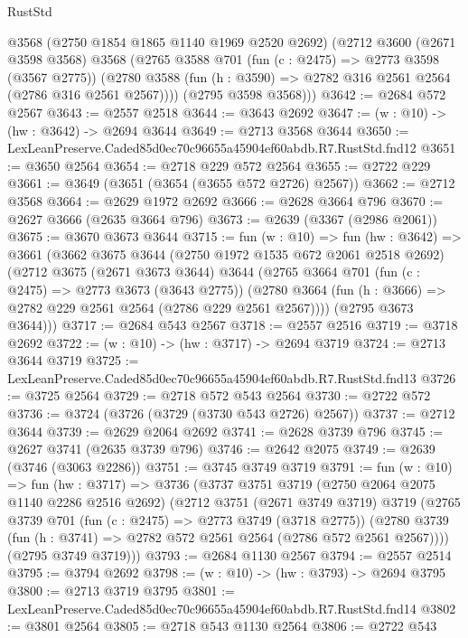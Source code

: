 \begin{lexlean}{RustStd}
\begin{coremodule}
      @3568
      (@2750 @1854 @1865 @1140 @1969 @2520 @2692)
      (@2712
        @3600
        (@2671 @3598 @3568)
        @3568
        (@2765
          @3588
          @701
          (fun (c : @2475) => @2773 @3598 (@3567 @2775))
          (@2780 @3588 (fun (h : @3590) => @2782 @316 @2561 @2564 (@2786 @316 @2561 @2567))))
        (@2795 @3598 @3568)))
@3642 := @2684 @572 @2567
@3643 := @2557 @2518
@3644 := @3643 @2692
@3647 := (w : @10) -> (hw : @3642) -> @2694 @3644
@3649 := @2713 @3568 @3644
@3650 := LexLeanPreserve.Caded85d0ec70c96655a45904ef60abdb.R7.RustStd.fnd12
@3651 := @3650 @2564
@3654 := @2718 @229 @572 @2564
@3655 := @2722 @229
@3661 := @3649 (@3651 (@3654 (@3655 @572 @2726) @2567))
@3662 := @2712 @3568
@3664 := @2629 @1972 @2692
@3666 := @2628 @3664 @796
@3670 := @2627 @3666 (@2635 @3664 @796)
@3673 := @2639 (@3367 (@2986 @2061))
@3675 := @3670 @3673 @3644
@3715 := fun (w : @10) =>
  fun (hw : @3642) =>
  @3661
    (@3662
      @3675
      @3644
      (@2750 @1972 @1535 @672 @2061 @2518 @2692)
      (@2712
        @3675
        (@2671 @3673 @3644)
        @3644
        (@2765
          @3664
          @701
          (fun (c : @2475) => @2773 @3673 (@3643 @2775))
          (@2780 @3664 (fun (h : @3666) => @2782 @229 @2561 @2564 (@2786 @229 @2561 @2567))))
        (@2795 @3673 @3644)))
@3717 := @2684 @543 @2567
@3718 := @2557 @2516
@3719 := @3718 @2692
@3722 := (w : @10) -> (hw : @3717) -> @2694 @3719
@3724 := @2713 @3644 @3719
@3725 := LexLeanPreserve.Caded85d0ec70c96655a45904ef60abdb.R7.RustStd.fnd13
@3726 := @3725 @2564
@3729 := @2718 @572 @543 @2564
@3730 := @2722 @572
@3736 := @3724 (@3726 (@3729 (@3730 @543 @2726) @2567))
@3737 := @2712 @3644
@3739 := @2629 @2064 @2692
@3741 := @2628 @3739 @796
@3745 := @2627 @3741 (@2635 @3739 @796)
@3746 := @2642 @2075
@3749 := @2639 (@3746 (@3063 @2286))
@3751 := @3745 @3749 @3719
@3791 := fun (w : @10) =>
  fun (hw : @3717) =>
  @3736
    (@3737
      @3751
      @3719
      (@2750 @2064 @2075 @1140 @2286 @2516 @2692)
      (@2712
        @3751
        (@2671 @3749 @3719)
        @3719
        (@2765
          @3739
          @701
          (fun (c : @2475) => @2773 @3749 (@3718 @2775))
          (@2780 @3739 (fun (h : @3741) => @2782 @572 @2561 @2564 (@2786 @572 @2561 @2567))))
        (@2795 @3749 @3719)))
@3793 := @2684 @1130 @2567
@3794 := @2557 @2514
@3795 := @3794 @2692
@3798 := (w : @10) -> (hw : @3793) -> @2694 @3795
@3800 := @2713 @3719 @3795
@3801 := LexLeanPreserve.Caded85d0ec70c96655a45904ef60abdb.R7.RustStd.fnd14
@3802 := @3801 @2564
@3805 := @2718 @543 @1130 @2564
@3806 := @2722 @543

\end{coremodule}
\end{lexlean}
